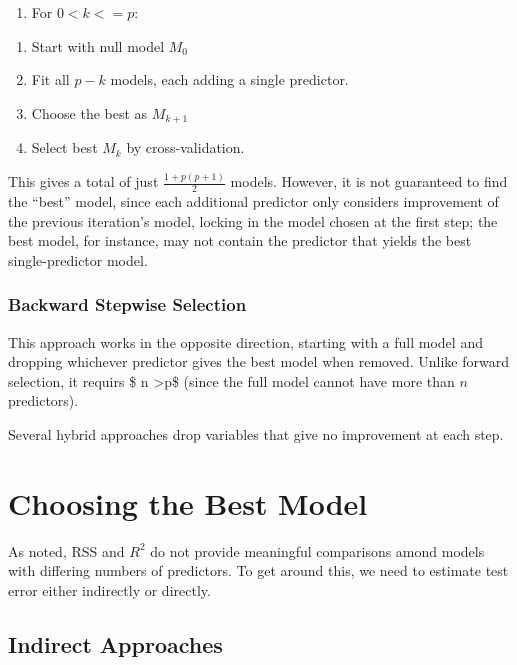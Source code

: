 \documentclass[
]{article}
\providecommand{\tightlist}{%
  \setlength{\itemsep}{0pt}\setlength{\parskip}{0pt}}
\begin{document}
\begin{enumerate}
\def\labelenumi{\arabic{enumi}.}
\tightlist
\item
  For \(0 < k <= p\):
\end{enumerate}

\begin{enumerate}
\def\labelenumi{\alph{enumi}.}
\tightlist
\item
  Start with null model \(M_0\)\\
\item
  Fit all \(p-k\) models, each adding a single predictor.
\item
  Choose the best as \(M_{k+1}\)
\item
  Select best \(M_k\) by cross-validation.
\end{enumerate}

This gives a total of just \(\frac{1+p(p+1)}{2}\) models. However, it is
not guaranteed to find the ``best'' model, since each additional
predictor only considers improvement of the previous iteration's model,
locking in the model chosen at the first step; the best model, for
instance, may not contain the predictor that yields the best
single-predictor model.

\hypertarget{backward-stepwise-selection}{%
\subsubsection{Backward Stepwise
Selection}\label{backward-stepwise-selection}}

This approach works in the opposite direction, starting with a full
model and dropping whichever predictor gives the best model when
removed. Unlike forward selection, it requirs \$ n \textgreater p\$
(since the full model cannot have more than \(n\) predictors).

Several hybrid approaches drop variables that give no improvement at
each step.

\hypertarget{choosing-the-best-model}{%
\section{Choosing the Best Model}\label{choosing-the-best-model}}

As noted, RSS and \(R^2\) do not provide meaningful comparisons amond
models with differing numbers of predictors. To get around this, we need
to estimate test error either indirectly or directly.

\hypertarget{indirect-approaches}{%
\subsection{Indirect Approaches}\label{indirect-approaches}}
\end{document}
